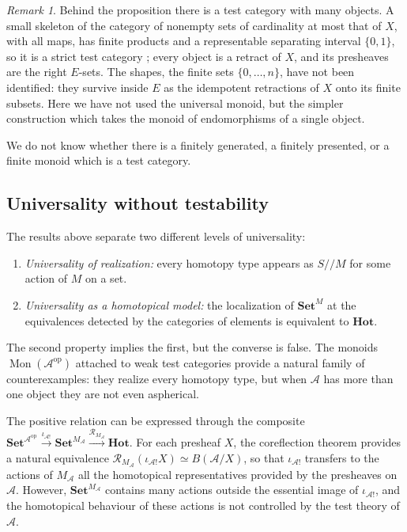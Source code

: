 \documentclass[11pt]{amsart}
\theoremstyle{definition}
\theoremstyle{remark}
\newtheorem{remark}[teo]{Remark}
\numberwithin{figure}{section}%
\DeclareMathOperator{\Mon}{Mon}
\newcommand{\Set}{\mathbf{Set}}
\newcommand{\Hot}{\mathbf{Hot}}
\newcommand{\op}{\mathrm{op}}
\newcommand{\A}{\mathcal{A}}
\begin{document}
\begin{remark}
Behind the proposition there is a test category with many objects. A small skeleton of the category of nonempty sets of cardinality at most that of $X$, with all maps, has finite products and a representable separating interval $\{0,1\}$, so it is a strict test category \cite[Ex.~1.6.4 and Cor.~1.6.9]{Malt}; every object is a retract of $X$, and its presheaves are the right $E$-sets. The shapes, the finite sets $\{0,\dots,n\}$, have not been identified: they survive inside $E$ as the idempotent retractions of $X$ onto its finite subsets. Here we have not used the universal monoid, but the simpler construction which takes the monoid of endomorphisms of a single object.
\end{remark}

We do not know whether there is a finitely generated, a finitely presented, or a finite monoid which is a test category.

\subsection{Universality without testability}
\label{subsec:universality-without-testability}

The results above separate two different levels of universality:
\begin{enumerate}
\item \emph{Universality of realization:} every homotopy type appears as $S/\!/M$ for some action of $M$ on a set.
\item \emph{Universality as a homotopical model:} the localization of $\Set^M$ at the equivalences detected by the categories of elements is equivalent to $\Hot$.
\end{enumerate}
The second property implies the first, but the converse is false. The monoids $\Mon(\A^{\op})$ attached to weak test categories provide a natural family of counterexamples: they realize every homotopy type, but when $\A$ has more than one object they are not even aspherical.

The positive relation can be expressed through the composite $\Set^{\A^{\op}}\xrightarrow{\iota_{\A!}}\Set^{M_\A}\xrightarrow{\mathcal R_{M_\A}}\Hot$. For each presheaf $X$, the coreflection theorem provides a natural equivalence $\mathcal R_{M_\A}(\iota_{\A!}X)\simeq B(\A/X)$, so that $\iota_{\A!}$ transfers to the actions of $M_\A$ all the homotopical representatives provided by the presheaves on $\A$. However, $\Set^{M_\A}$ contains many actions outside the essential image of $\iota_{\A!}$, and the homotopical behaviour of these actions is not controlled by the test theory of $\A$.
\end{document}
